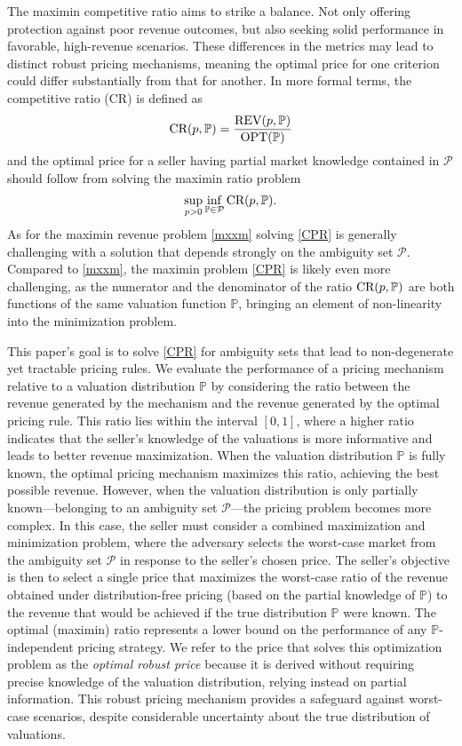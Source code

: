 \documentclass[11pt]{article}
\newcommand{\bP}{\mathbb{P}}
\newcommand{\cP}{\mathcal{P}}
\newcommand{\1}{\mathds{1}}
\begin{document}
The maximin competitive ratio aims to strike a balance. Not only offering protection against poor revenue outcomes, but also seeking solid performance in favorable, high-revenue scenarios. These differences in the metrics may lead to distinct robust pricing mechanisms, meaning the optimal price for one criterion could differ substantially from that for another. In more formal terms, the competitive ratio (CR) is defined as
\begin{align}
\textup{CR}(p,\bP)=\frac{\textup{REV}(p,\bP)}{\textup{OPT}(\bP)}
\end{align}
and the optimal price for a seller having partial market knowledge contained in $\cP$ should follow from solving the maximin ratio problem 
\begin{align}\label{CPR}
 \sup_{p> 0} \inf_{\bP\in \cP} \textup{CR}(p,\bP). 
\end{align}
As for the maximin revenue problem \eqref{mxxm} solving \eqref{CPR} is generally challenging with a solution that depends strongly on the ambiguity set $\cP$. Compared to \eqref{mxxm}, the maximin problem \eqref{CPR} is likely even more challenging, as the numerator and the denominator of the ratio $\textup{CR}(p,\bP)$ are both functions of the same valuation function $\bP$, bringing an element of non-linearity into the minimization problem.

This paper's goal is to solve \eqref{CPR} for ambiguity sets that lead to non-degenerate yet tractable pricing rules. We evaluate the performance of a pricing mechanism relative to a valuation distribution $\bP$ by considering the ratio between the revenue generated by the mechanism and the revenue generated by the optimal pricing rule. This ratio lies within the interval $[0,1]$, where a higher ratio indicates that the seller's knowledge of the valuations is more informative and leads to better revenue maximization.
When the valuation distribution $\bP$ is fully known, the optimal pricing mechanism maximizes this ratio, achieving the best possible revenue. However, when the valuation distribution is only partially known—belonging to an ambiguity set $\cP$—the pricing problem becomes more complex. In this case, the seller must consider a combined maximization and minimization problem, where the adversary selects the worst-case market from the ambiguity set $\cP$ in response to the seller's chosen price.
The seller's objective is then to select a single price that maximizes the worst-case ratio of the revenue obtained under distribution-free pricing (based on the partial knowledge of $\bP$) to the revenue that would be achieved if the true distribution $\bP$ were known.
The optimal (maximin) ratio represents a lower bound on the performance of any $\bP$-independent pricing strategy. We refer to the price that solves this optimization problem as the {\it optimal robust price} because it is derived without requiring precise knowledge of the valuation distribution, relying instead on partial information. This robust pricing mechanism provides a safeguard against worst-case scenarios, despite considerable uncertainty about the true distribution of valuations.
\end{document}
